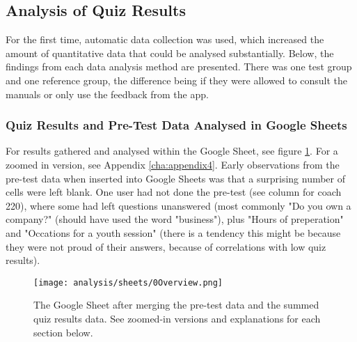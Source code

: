 \subsection{Analysis of Quiz Results}






For the first time, automatic data collection was used, which increased the amount of quantitative data that could be analysed substantially. Below, the findings from each data analysis method are presented. There was one test group and one reference group, the difference being if they were allowed to consult the manuals or only use the feedback from the app.

\subsubsection{Quiz Results and Pre-Test Data Analysed in Google Sheets}
For results gathered and analysed within the Google Sheet, see figure \ref{fig:analysFarg3}. For a zoomed in version, see Appendix \ref{cha:appendix4}. Early observations from the pre-test data when inserted into Google Sheets was that a surprising number of cells were left blank. One user had not done the pre-test (see column for coach 220), where some had left questions unanswered (most commonly "Do you own a company?" (should have used the word "business"), plus "Hours of preperation" and "Occations for a youth session" (there is a tendency this might be because they were not proud of their answers, because of correlations with low quiz results).

\begin{figure}[h]
    \centering
    \texttt{[image: analysis/sheets/0Overview.png]}
    \caption{The Google Sheet after merging the pre-test data and the summed quiz results data. See zoomed-in versions and explanations for each section below.}
    \label{fig:analysFarg3}
\end{figure}

